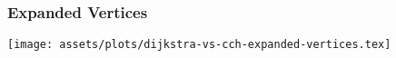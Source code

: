 \begin{frame}
    \frametitle{Expanded Vertices}
    \centering
    \texttt{[image: assets/plots/dijkstra-vs-cch-expanded-vertices.tex]}   
\end{frame}